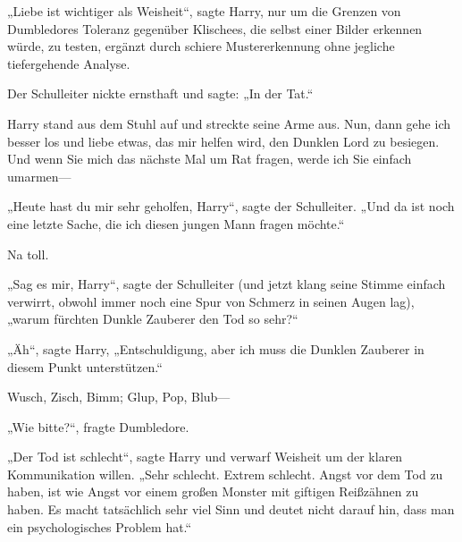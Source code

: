 „Liebe ist wichtiger als Weisheit“, sagte Harry, nur um die Grenzen von Dumbledores Toleranz gegenüber Klischees, die selbst einer Bilder erkennen würde, zu testen, ergänzt durch schiere Mustererkennung ohne jegliche tiefergehende Analyse.

Der Schulleiter nickte ernsthaft und sagte: „In der Tat.“

Harry stand aus dem Stuhl auf und streckte seine Arme aus. Nun, dann gehe ich besser los und liebe etwas, das mir helfen wird, den Dunklen Lord zu besiegen. Und wenn Sie mich das nächste Mal um Rat fragen, werde ich Sie einfach umarmen—

„Heute hast du mir sehr geholfen, Harry“, sagte der Schulleiter. „Und da ist noch eine letzte Sache, die ich diesen jungen Mann fragen möchte.“

Na toll.

„Sag es mir, Harry“, sagte der Schulleiter (und jetzt klang seine Stimme einfach verwirrt, obwohl immer noch eine Spur von Schmerz in seinen Augen lag), „warum fürchten Dunkle Zauberer den Tod so sehr?“

„Äh“, sagte Harry, „Entschuldigung, aber ich muss die Dunklen Zauberer in diesem Punkt unterstützen.“

\later

Wusch, Zisch, Bimm; Glup, Pop, Blub—

„Wie bitte?“, fragte Dumbledore.

„Der Tod ist schlecht“, sagte Harry und verwarf Weisheit um der klaren Kommunikation willen. „Sehr schlecht. Extrem schlecht. Angst vor dem Tod zu haben, ist wie Angst vor einem großen Monster mit giftigen Reißzähnen zu haben. Es macht tatsächlich sehr viel Sinn und deutet nicht darauf hin, dass man ein psychologisches Problem hat.“

